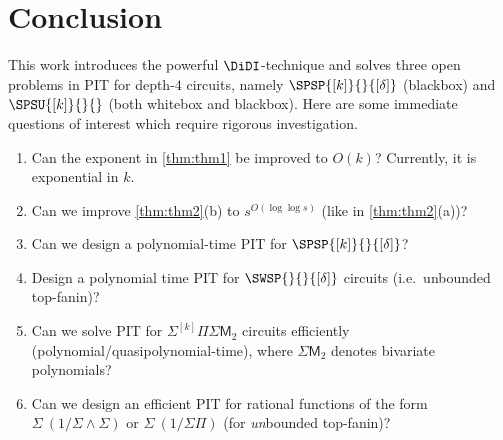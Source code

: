 \section{Conclusion}

This work introduces the powerful $\DiDI$-technique and solves three open problems in PIT for depth-$4$ circuits, namely $\SPSP{[k]}{}{[\delta]}$ (blackbox) and $\SPSU{[k]}{}{}$ (both whitebox and blackbox). Here are some immediate questions of interest which require rigorous investigation.
\begin{enumerate}
	\item Can the exponent in \autoref{thm:thm1} be improved to $O(k)$? Currently, it is exponential in $k$.    
    \item Can we improve \autoref{thm:thm2}(b) to $s^{O(\log \log s)}$ (like in \autoref{thm:thm2}(a))?
    \item Can we design a polynomial-time PIT for $\SPSP{[k]}{}{[\delta]}$?
    \item Design a polynomial time PIT for $\SWSP{}{}{[\delta]}$ circuits (i.e.~unbounded top-fanin)? 
    \item Can we solve PIT for $\Sigma^{[k]}\Pi\Sigma\mathsf{M}_2$ circuits efficiently (polynomial/quasipolynomial-time), where \(\Sigma\mathsf{M}_2\) denotes bivariate polynomials?    
    \item Can we design an efficient PIT for rational functions of the form $\Sigma^{}\,(1/\Sigma\wedge\Sigma)$ or $\Sigma^{}\,(1/\Sigma\Pi)$ (for {\em un}bounded top-fanin)?
\end{enumerate}
